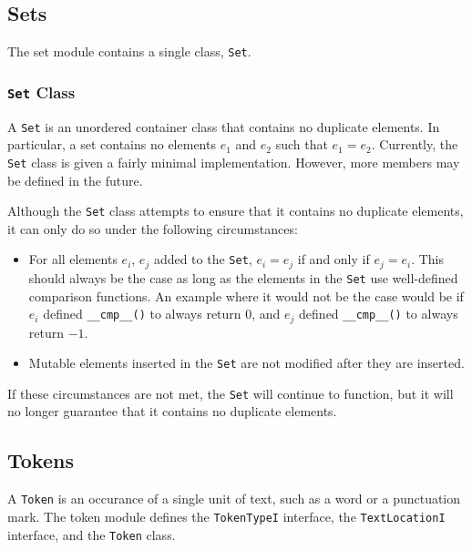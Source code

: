 \documentclass{article}
\begin{document}
\subsection{Sets}

The set module contains a single class, \texttt{Set}.

\subsubsection{\texttt{Set} Class}

    A \texttt{Set} is an unordered container class that contains no
    duplicate elements.  In particular, a set contains no elements
    $e_1$ and $e_2$ such that $e_1=e_2$.  Currently, the \texttt{Set}
    class is given a fairly minimal implementation.  However, more
    members may be defined in the future.

    Although the \texttt{Set} class attempts to ensure that it
    contains no duplicate elements, it can only do so under the
    following circumstances:
    
    \begin{itemize}
      \item For all elements $e_i$, $e_j$ added to the \texttt{Set},
           $e_i=e_j$ if and only if $e_j=e_i$.  This should always be the
           case as long as the elements in the \texttt{Set} use
           well-defined comparison functions.  An example where it
           would not be the case would be if $e_i$ defined
           \texttt{\_\_cmp\_\_()} to always return 0, and $e_j$
           defined \texttt{\_\_cmp\_\_()} to always return $-1$.
           
      \item Mutable elements inserted in the \texttt{Set} are not
           modified after they are inserted.
    \end{itemize}

    If these circumstances are not met, the \texttt{Set} will
    continue to function, but it will no longer guarantee that it
    contains no duplicate elements.
 
\subsection{Tokens}

A \texttt{Token} is an occurance of a single unit of text, such as a word or a
punctuation mark.  The token module defines the \texttt{TokenTypeI}
interface, the \texttt{TextLocationI} interface, and the \texttt{Token}
class.
\end{document}
